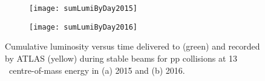 \begin{figure}[t!]
\centering
\begin{subfigure}[t]{0.48\textwidth}
\texttt{[image: sumLumiByDay2015]}
\end{subfigure}
\begin{subfigure}[t]{0.48\textwidth}
\texttt{[image: sumLumiByDay2016]}
\end{subfigure}
\vspace{-0.3cm}
\caption{
Cumulative luminosity versus time delivered to (green) and recorded by ATLAS 
(yellow) during stable beams for pp collisions at 13 \TeV~centre-of-mass energy 
in (a) 2015 and (b) 2016.
}
\label{fig:exp.op.intlumi}
\end{figure} 


